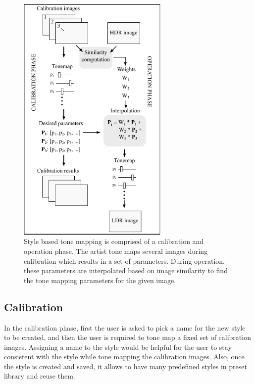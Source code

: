 \begin{figure}
\begin{center}
\includegraphics[width=0.65\textwidth]{figures/chapter5/algorithm.pdf}
\caption{Style based tone mapping is comprised of a calibration and operation phase. The artist tone maps several images during calibration which results in a set of parameters. During operation, these parameters are interpolated based on image similarity to find the tone mapping parameters for the given image.}
\label{fig:calibration_operation}
\end{center}
\end{figure}

\subsection{Calibration}
In the calibration phase, first the user is asked to pick a name for the new style to be created, and then the user is required to tone map a fixed set of calibration images. Assigning a name to the style would be helpful for the user to stay consistent with the style while tone mapping the calibration images. Also, once the style is created and saved, it allows to have many predefined styles in preset library and reuse them. 

